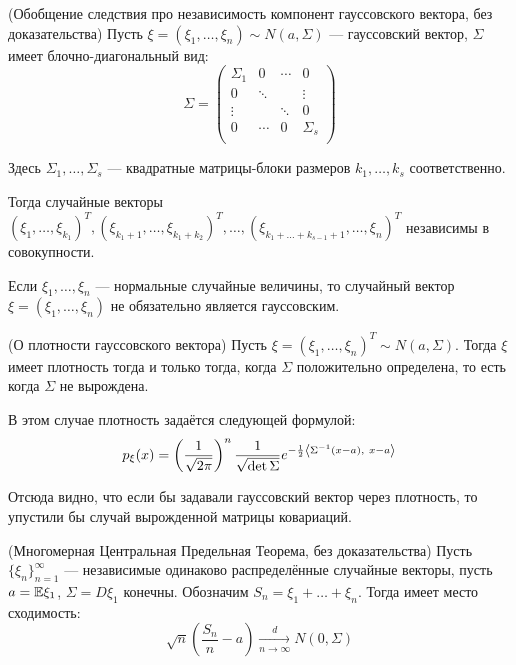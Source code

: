 \begin{corollary}  (Обобщение следствия про независимость компонент гауссовского вектора, без доказательства)
    Пусть $\xi = (\xi_1, \ldots, \xi_n) \sim N(a, \Sigma)$ --- гауссовский вектор, $\Sigma$ имеет блочно-диагональный вид:
    \[
        \Sigma =
        \begin{pmatrix}
            \Sigma_1 & 0 & \cdots & 0 \\
            0 & \ddots & & \vdots \\
            \vdots & & \ddots & 0 \\
            0 & \cdots & 0 & \Sigma_s \\
        \end{pmatrix}
    \]
    
    Здесь $\Sigma_1, \ldots, \Sigma_s$ --- квадратные матрицы-блоки размеров $k_1, \ldots, k_s$ соответственно.

    Тогда случайные векторы $(\xi_1, \ldots, \xi_{k_1})^T, (\xi_{k_1+1}, \ldots, \xi_{k_1+k_2})^T, \ldots, (\xi_{k_1 + \ldots + k_{s-1} +1}, \ldots, \xi_n)^T$ независимы в совокупности.
\end{corollary}

\begin{exercise}
    Если  $\xi_1, \ldots, \xi_n$ --- нормальные случайные величины, то случайный вектор $\xi = (\xi_1, \ldots, \xi_n)$ не обязательно является гауссовским.
\end{exercise}

\begin{exercise} (О плотности гауссовского вектора)
    Пусть $\xi = (\xi_1, \ldots, \xi_n)^T \sim N(a, \Sigma)$. Тогда $\xi$ имеет плотность тогда и только тогда, когда $\Sigma$ положительно определена, то есть когда $\Sigma$ не вырождена.

    В этом случае плотность задаётся следующей формулой:
    \[
        p_\xi(x) = \left( \frac{1}{\sqrt{2\pi}} \right)^n \frac{1}{\sqrt{\det \Sigma}} e^{-\frac{1}{2} \tbr{\Sigma^{-1}(x-a),\ x-a}}
    \]
\end{exercise}

\begin{note}
    Отсюда видно, что если бы задавали гауссовский вектор через плотность, то упустили бы случай вырожденной матрицы ковариаций.
\end{note}

\begin{theorem} (Многомерная Центральная Предельная Теорема, без доказательства)
    Пусть $\{\xi_n\}_{n = 1}^\infty$ --- независимые одинаково распределённые случайные векторы, пусть $a = \mathbb{E}\xi_1$, $\Sigma = D\xi_1$ конечны. Обозначим $S_n = \xi_1 + \ldots + \xi_n$. Тогда имеет место сходимость:
    \[
        \sqrt{n} \left( \frac{S_n}{n} - a \right) \xrightarrow[n \to \infty]{d} N(0, \Sigma)
    \]
\end{theorem}

